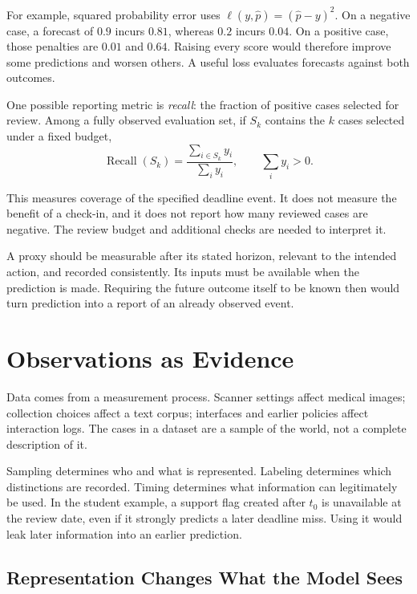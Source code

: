 For example, squared probability error uses $\ell(y,\hat p)=(\hat p-y)^2$. On a negative case, a forecast of $0.9$ incurs $0.81$, whereas $0.2$ incurs $0.04$. On a positive case, those penalties are $0.01$ and $0.64$. Raising every score would therefore improve some predictions and worsen others. A useful loss evaluates forecasts against both outcomes.

\begin{samepage}
One possible reporting metric is \emph{recall}: the fraction of positive cases selected for review. Among a fully observed evaluation set, if $S_k$ contains the $k$ cases selected under a fixed budget,
\[
\operatorname{Recall}(S_k)=
\frac{\sum_{i\in S_k}y_i}{\sum_i y_i},
\qquad \sum_i y_i>0.
\]
\end{samepage}
This measures coverage of the specified deadline event. It does not measure the benefit of a check-in, and it does not report how many reviewed cases are negative. The review budget and additional checks are needed to interpret it.

A proxy should be measurable after its stated horizon, relevant to the intended action, and recorded consistently. Its inputs must be available when the prediction is made. Requiring the future outcome itself to be known then would turn prediction into a report of an already observed event.

\section{Observations as Evidence}

Data comes from a measurement process. Scanner settings affect medical images; collection choices affect a text corpus; interfaces and earlier policies affect interaction logs. The cases in a dataset are a sample of the world, not a complete description of it.

Sampling determines who and what is represented. Labeling determines which distinctions are recorded. Timing determines what information can legitimately be used. In the student example, a support flag created after $t_0$ is unavailable at the review date, even if it strongly predicts a later deadline miss. Using it would leak later information into an earlier prediction.

\subsection{Representation Changes What the Model Sees}


